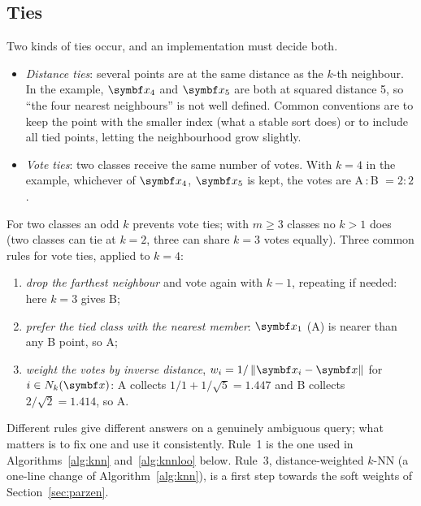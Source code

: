 \documentclass[11pt]{article}
\begin{document}
\subsection{Ties}\label{sec:ties}

Two kinds of ties occur, and an implementation must decide both.
\begin{itemize}
\item \emph{Distance ties}: several points are at the same distance as the $k$-th neighbour. In the example, $\x_4$ and
$\x_5$ are both at squared distance 5, so ``the four nearest neighbours'' is not well defined. Common conventions
are to keep the point with the smaller index (what a stable sort does) or to include all tied points, letting the
neighbourhood grow slightly.
\item \emph{Vote ties}: two classes receive the same number of votes. With $k = 4$ in the example, whichever of
$\x_4$, $\x_5$ is kept, the votes are A\,:\,B $= 2 : 2$.
\end{itemize}
For two classes an odd $k$ prevents vote ties; with $m \ge 3$ classes no $k > 1$ does (two classes can tie at
$k = 2$, three can share $k = 3$ votes equally). Three common rules for vote ties, applied to $k = 4$:
\begin{enumerate}
\item \emph{drop the farthest neighbour} and vote again with $k - 1$, repeating if needed: here $k = 3$ gives B;
\item \emph{prefer the tied class with the nearest member}: $\x_1$ (A) is nearer than any B point, so A;
\item \emph{weight the votes by inverse distance}, $w_i = 1/\norm{\x_i - \x}$ for $i \in N_k(\x)$: A collects
$1/1 + 1/\sqrt{5} = 1.447$ and B collects $2/\sqrt{2} = 1.414$, so A.
\end{enumerate}
Different rules give different answers on a genuinely ambiguous query; what matters is to fix one and use it
consistently. Rule~1 is the one used in Algorithms~\ref{alg:knn} and~\ref{alg:knnloo} below. Rule~3, distance-weighted
$k$-NN (a one-line change of Algorithm~\ref{alg:knn}), is a first step towards the soft weights of
Section~\ref{sec:parzen}.
\end{document}
